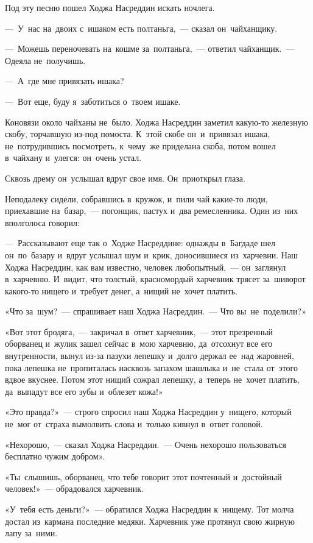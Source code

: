 \documentclass[12pt,a4paper]{book}
\begin{document}
Под эту песню пошел Ходжа Насреддин искать ночлега.

—~У~нас на~двоих с~ишаком есть полтаньга,~— сказал он~чайханщику.

—~Можешь переночевать на~кошме за~полтаньга,~— ответил чайханщик.~— Одеяла не~получишь.

—~А~где мне привязать ишака?

—~Вот еще, буду я~заботиться о~твоем ишаке.

Коновязи около чайханы не~было. Ходжа Насреддин заметил какую-то железную скобу, торчавшую из-под помоста. К~этой скобе он~и~привязал ишака, не~потрудившись посмотреть, к~чему~же приделана скоба, потом вошел в~чайхану и~улегся: он~очень устал.

Сквозь дрему он~услышал вдруг свое имя. Он~приоткрыл глаза.

Неподалеку сидели, собравшись в~кружок, и~пили чай какие-то люди, приехавшие на~базар,~— погонщик, пастух и~два ремесленника. Один из~них вполголоса говорил:

—~Рассказывают еще так о~Ходже Насреддине: однажды в~Багдаде шел он~по~базару и~вдруг услышал шум и~крик, доносившиеся из~харчевни. Наш Ходжа Насреддин, как вам известно, человек любопытный,~— он~заглянул в~харчевню. И~видит, что толстый, красномордый харчевник трясет за~шиворот какого-то нищего и~требует денег, а~нищий не~хочет платить.

«Что за~шум?~— спрашивает наш Ходжа Насреддин.~— Что вы~не~поделили?»

«Вот этот бродяга,~— закричал в~ответ харчевник,~— этот презренный оборванец и~жулик зашел сейчас в~мою харчевню, да~отсохнут все его внутренности, вынул из-за пазухи лепешку и~долго держал ее~над жаровней, пока лепешка не~пропиталась насквозь запахом шашлыка и~не~стала от~этого вдвое вкуснее. Потом этот нищий сожрал лепешку, а~теперь не~хочет платить, да~выпадут все его зубы и~облезет кожа!»

«Это правда?»~— строго спросил наш Ходжа Насреддин у~нищего, который не~мог от~страха вымолвить слова и~только кивнул в~ответ головой.

«Нехорошо,~— сказал Ходжа Насреддин.~— Очень нехорошо пользоваться бесплатно чужим добром».

«Ты~слышишь, оборванец, что тебе говорит этот почтенный и~достойный человек!»~— обрадовался харчевник.

«У~тебя есть деньги?»~— обратился Ходжа Насреддин к~нищему. Тот молча достал из~кармана последние медяки. Харчевник уже протянул свою жирную лапу за~ними.
\end{document}
